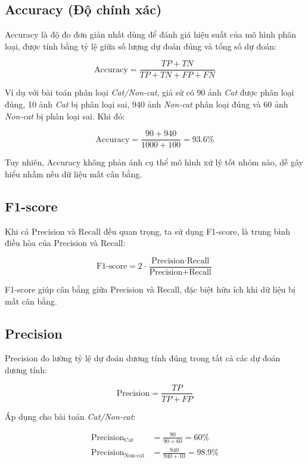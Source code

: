 \subsection {Accuracy (Độ chính xác)}
\label{eval:acc}
Accuracy là độ đo đơn giản nhất dùng để đánh giá hiệu suất của mô hình phân loại, được tính bằng tỷ lệ giữa số lượng dự đoán đúng và tổng số dự đoán:

\begin{equation}
\text{Accuracy} = \frac{TP + TN}{TP + TN + FP + FN}
\end{equation}

Ví dụ với bài toán phân loại \textit{Cat/Non-cat}, giả sử có 90 ảnh \textit{Cat} được phân loại đúng, 10 ảnh \textit{Cat} bị phân loại sai, 940 ảnh \textit{Non-cat} phân loại đúng và 60 ảnh \textit{Non-cat} bị phân loại sai. Khi đó:

\begin{equation}
\text{Accuracy} = \frac{90 + 940}{1000 + 100} = 93.6\%
\end{equation}

Tuy nhiên, Accuracy không phản ánh cụ thể mô hình xử lý tốt nhóm nào, dễ gây hiểu nhầm nếu dữ liệu mất cân bằng.

\subsection {F1-score}
\label{eval:f1}
Khi cả Precision và Recall đều quan trọng, ta sử dụng F1-score, là trung bình điều hòa của Precision và Recall:

\begin{equation}
\text{F1-score} = 2 \cdot \frac{\text{Precision} \cdot \text{Recall}}{\text{Precision} + \text{Recall}}
\end{equation}

F1-score giúp cân bằng giữa Precision và Recall, đặc biệt hữu ích khi dữ liệu bị mất cân bằng.

\subsection {Precision}
\label{eval:prec}
Precision đo lường tỷ lệ dự đoán dương tính đúng trong tất cả các dự đoán dương tính:

\begin{equation}
\text{Precision} = \frac{TP}{TP + FP}
\end{equation}

Áp dụng cho bài toán \textit{Cat/Non-cat}:

\begin{align*}
\text{Precision}_{\text{Cat}} &= \frac{90}{90 + 60} = 60\% \\
\text{Precision}_{\text{Non-cat}} &= \frac{940}{940 + 10} = 98.9\%
\end{align*}

